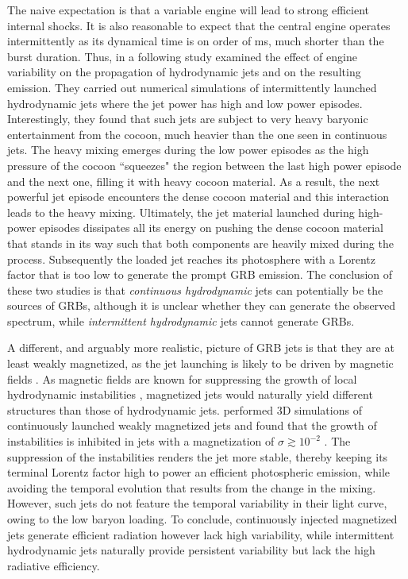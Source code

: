 \documentclass[fleqn,usenatbib]{mnras}
\begin{document}
	The naive expectation is that a variable engine will lead to strong efficient internal shocks. It is also reasonable to expect that the central engine operates intermittently as its dynamical time is on order of ms, much shorter than the burst duration. Thus, in a following study \cite{Gottlieb2020a} examined the effect of engine variability on the propagation of hydrodynamic jets and on the resulting emission. They carried out numerical simulations of  intermittently launched hydrodynamic jets where the jet power has high and low power episodes. Interestingly, they found that such jets are subject to very heavy baryonic entertainment from the cocoon, much heavier than the one seen in continuous jets. The heavy mixing emerges during the low power episodes as the high pressure of the cocoon ``squeezes" the region between the last high power episode and the next one, filling it with heavy cocoon material. As a result, the next powerful jet episode encounters the dense cocoon material and this interaction leads to the heavy mixing. Ultimately, the jet material launched during high-power episodes dissipates all its energy on pushing the dense cocoon material that stands in its way such that both components are heavily mixed during the process. Subsequently the loaded jet reaches its photosphere with a Lorentz factor that is too low to generate the prompt GRB emission. The conclusion of these two studies is that {\it continuous hydrodynamic} jets can potentially be the sources of GRBs, although it is unclear whether they can generate the observed spectrum, while {\it intermittent hydrodynamic} jets cannot generate GRBs.
	
	A different, and arguably more realistic, picture of GRB jets is that they are at least weakly magnetized, as the jet launching is likely to be driven by magnetic fields \citep{Blandford1977,Komissarov2001}.
	As magnetic fields are known for suppressing the growth of local hydrodynamic instabilities \citep[e.g.][]{Millas2017,Matsumoto2019}, magnetized jets would naturally yield different structures than those of hydrodynamic jets.
	\citet{Gottlieb2020b} performed 3D simulations of continuously launched weakly magnetized jets and found that the growth of instabilities is inhibited in jets with a magnetization of $ \sigma \gtrsim 10^{-2} $ \citep[see also][]{Matsumoto2020}. The suppression of the instabilities renders the jet more stable, thereby keeping its terminal Lorentz factor high to power an efficient photospheric emission, while avoiding the temporal evolution that results from the change in the mixing. However, such jets do not feature the temporal variability in their light curve, owing to the low baryon loading. To conclude, continuously injected magnetized jets generate efficient radiation however lack high variability, while intermittent hydrodynamic jets naturally provide persistent variability but lack the high radiative efficiency. 
\end{document}
